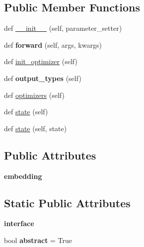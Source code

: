 \subsection*{Public Member Functions}
\begin{DoxyCompactItemize}
\item 
def \hyperlink{classrnn_1_1RNNEncoder_a6343d431863b1f7a08e664936b6caaa7}{\+\_\+\+\_\+init\+\_\+\+\_\+} (self, parameter\+\_\+setter)
\item 
def {\bfseries forward} (self, args, kwargs)\hypertarget{classrnn_1_1RNNEncoder_a73ba73746a599e8b62a223e6e4b332cf}{}\label{classrnn_1_1RNNEncoder_a73ba73746a599e8b62a223e6e4b332cf}

\item 
def \hyperlink{classrnn_1_1RNNEncoder_a1965c444c4c8d86e0640af9f6edb4b34}{init\+\_\+optimizer} (self)
\item 
def {\bfseries output\+\_\+types} (self)\hypertarget{classrnn_1_1RNNEncoder_a5af31a1f2f83c840ff6f32a4991634c7}{}\label{classrnn_1_1RNNEncoder_a5af31a1f2f83c840ff6f32a4991634c7}

\item 
def \hyperlink{classrnn_1_1RNNEncoder_a42aee24e8b221841bd7deefef9b9dd5c}{optimizers} (self)
\item 
def \hyperlink{classrnn_1_1RNNEncoder_a837ba9ca05276126a3a258314f9dac33}{state} (self)
\item 
def \hyperlink{classrnn_1_1RNNEncoder_a8e1030a1cddb21b7ea4e95d11b3bd8f9}{state} (self, state)
\end{DoxyCompactItemize}
\subsection*{Public Attributes}
\begin{DoxyCompactItemize}
\item 
{\bfseries embedding}\hypertarget{classrnn_1_1RNNEncoder_a76b87186f8433f0d9495d70c10a4fa76}{}\label{classrnn_1_1RNNEncoder_a76b87186f8433f0d9495d70c10a4fa76}

\end{DoxyCompactItemize}
\subsection*{Static Public Attributes}
\begin{DoxyCompactItemize}
\item 
{\bfseries interface}
\item 
bool {\bfseries abstract} = True\hypertarget{classrnn_1_1RNNEncoder_a73ce0d8e44e88bec684c3b8bd1536560}{}\label{classrnn_1_1RNNEncoder_a73ce0d8e44e88bec684c3b8bd1536560}

\end{DoxyCompactItemize}


